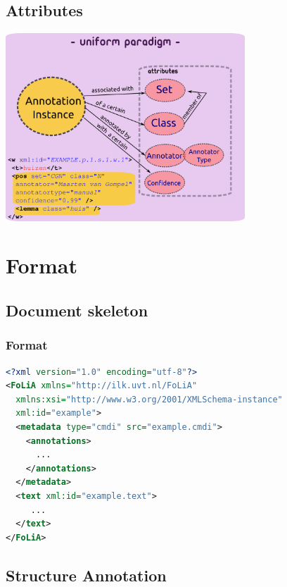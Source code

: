 \documentclass[compress,10pt]{beamer}
\begin{document}
\subsection{Attributes}

\begin{frame}
        \begin{center}
        \includegraphics[width=90.0mm]{paradigm.png}
        \end{center}
\end{frame}


\section{Format}

\subsection{Document skeleton}

\begin{frame}[fragile]
\frametitle{Format}
\begin{lstlisting}[language=xml]
<?xml version="1.0" encoding="utf-8"?>
<FoLiA xmlns="http://ilk.uvt.nl/FoLiA"
  xmlns:xsi="http://www.w3.org/2001/XMLSchema-instance"
  xml:id="example">
  <metadata type="cmdi" src="example.cmdi">    
    <annotations>
      ...
    </annotations>   
  </metadata>
  <text xml:id="example.text">
     ...
  </text>
</FoLiA>  
\end{lstlisting}
\end{frame}

\subsection{Structure Annotation}
\end{document}
